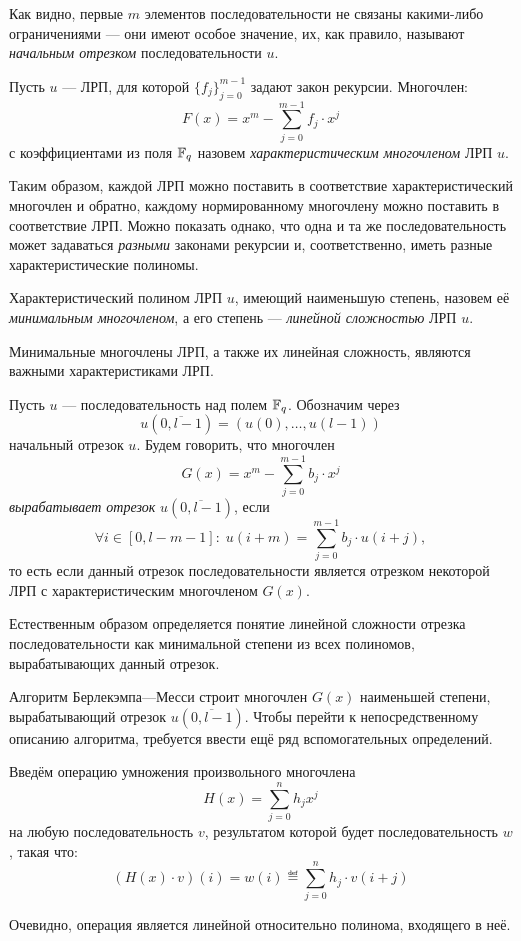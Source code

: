 \documentclass[14pt]{extarticle}
\begin{document}
Как видно, первые $m$ элементов последовательности не связаны какими-либо ограничениями — они имеют особое значение, их, как правило, 
называют \emph{начальным отрезком} последовательности $u$.

Пусть $u$ — ЛРП, для  которой $\{f_j\}_{j=0}^{m-1}$ задают закон рекурсии. 
Многочлен:
\[F(x)=x^{m} -\sum _{j=0}^{m-1}f_{j} \cdot x^{j}  \]
с коэффициентами из поля $\mathbb F_q$ назовем \emph{характеристическим многочленом} 
ЛРП $u$.

Таким образом, каждой ЛРП можно поставить в соответствие характеристический многочлен и обратно, каждому нормированному многочлену можно поставить в соответствие ЛРП. Можно показать однако, что одна и та же последовательность может задаваться \emph{разными} законами рекурсии и, соответственно, иметь разные характеристические полиномы.

Характеристический полином ЛРП $u$, имеющий наименьшую степень, назовем её \emph{минимальным многочленом}, а его степень — \emph{линейной сложностью} ЛРП $u$.

Минимальные многочлены ЛРП, а также их линейная сложность, являются важными характеристиками ЛРП. 

Пусть $u$ — последовательность над полем $\mathbb F_q$. Обозначим через
$$u\left(\overline{0,l-1}\right)=(u(0),\ldots ,u(l-1))$$
начальный отрезок $u$. Будем говорить, что многочлен
\[G(x)=x^{m} -\sum _{j=0}^{m-1}b_{j} \cdot x^{j}\] 
\emph{вырабатывает отрезок} $u\left(\overline{0,l-1}\right)$, если
\[\forall i\in [0,l-m-1]:\; u(i+m)=\sum _{j=0}^{m-1}b_{j} \cdot u(i+j),\] 
то есть если данный отрезок последовательности является отрезком некоторой ЛРП с характеристическим многочленом $G(x)$.

 Естественным образом определяется понятие линейной сложности отрезка последовательности как минимальной степени из всех полиномов, вырабатывающих данный отрезок.

Алгоритм Берлекэмпа—Месси строит многочлен $G(x)$ наименьшей степени, вырабатывающий отрезок $u\left(\overline{0,l-1}\right)$. Чтобы перейти к непосредственному описанию алгоритма, требуется ввести ещё ряд вспомогательных определений.

Введём операцию умножения произвольного многочлена
$$H(x)=\sum _{j=0}^{n}h_{j} x^{j}$$
на любую последовательность $v$, результатом которой будет последовательность 
$w$, такая что:
\[(H(x)\cdot v)(i)=w(i)\eqdef\sum _{j=0}^{n}h_{j} \cdot v(i+j) \] 

Очевидно, операция является линейной относительно полинома, входящего в неё.
\end{document}
